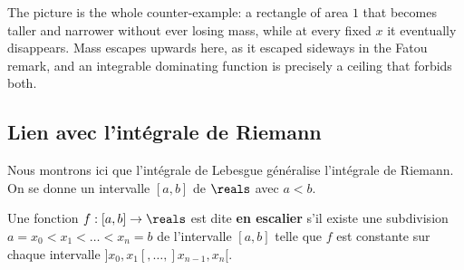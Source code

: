 \begin{figure}[h!]
  \centering
\end{figure}

\medskip
The picture is the whole counter-example: a rectangle of area $1$ that becomes
taller and narrower without ever losing mass, while at every fixed $x$ it eventually
disappears. Mass escapes upwards here, as it escaped sideways in the Fatou remark,
and an integrable dominating function is precisely a ceiling that forbids both.

\subsection{Lien avec l'intégrale de Riemann}

Nous montrons ici que l'intégrale de Lebesgue généralise l'intégrale de Riemann. On
se donne un intervalle $[a,b]$ de $\reals$ avec $a < b$.

\begin{definition}
  Une fonction $f : [a,b] \to \reals$ est dite \textbf{en escalier} s'il existe une
  subdivision $a = x_{0} < x_{1} < \ldots < x_{n} = b$ de l'intervalle $[a,b]$ telle
  que $f$ est constante sur chaque intervalle $]x_{0},x_{1}[, \ldots,
  ]x_{n-1},x_{n}[$.
\end{definition}

